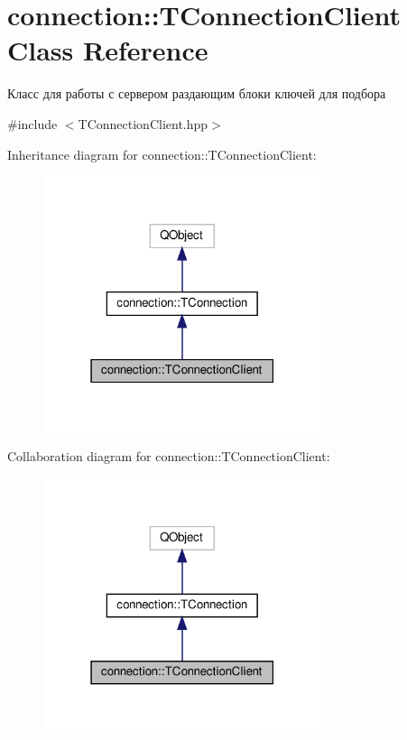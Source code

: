 \hypertarget{classconnection_1_1_t_connection_client}{}\section{connection\+:\+:T\+Connection\+Client Class Reference}
\label{classconnection_1_1_t_connection_client}


Класс для работы с сервером раздающим блоки ключей для подбора  




{\ttfamily \#include $<$T\+Connection\+Client.\+hpp$>$}



Inheritance diagram for connection\+:\+:T\+Connection\+Client\+:\nopagebreak
\begin{figure}[H]
\begin{center}
\leavevmode
\includegraphics[width=231pt]{classconnection_1_1_t_connection_client__inherit__graph}
\end{center}
\end{figure}


Collaboration diagram for connection\+:\+:T\+Connection\+Client\+:\nopagebreak
\begin{figure}[H]
\begin{center}
\leavevmode
\includegraphics[width=231pt]{classconnection_1_1_t_connection_client__coll__graph}
\end{center}
\end{figure}
